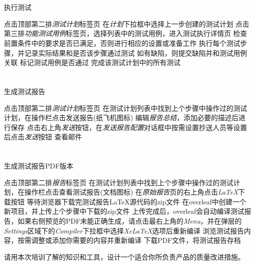 \documentclass[12pt,addpoints,fleqn]{exam}
\begin{document}
\begin{questions}
\begin{parts}
  \part{}执行测试
  \begin{subparts}
    \subpart{}点击顶部第二排\emph{测试计划}标签页
    \subpart{}在\emph{计划}下拉框中选择上一步创建的测试计划
    \subpart{}点击第三排\emph{功能测试用例}标签页，选择列表中的测试用例，进入测试执行详情页
    \subpart{}检查前置条件中的要求是否已满足，否则进行相应的设置或准备工作
    \subpart{}执行每个测试步骤，并记录实际结果和是否该步骤通过测试
    \subpart{}如有缺陷，则提交缺陷并和测试用例关联
    \subpart{}标记测试用例是否通过
    \subpart{}完成该测试计划中的所有测试
  \end{subparts}

  \part{}生成测试报告
  \begin{subparts}
    \subpart{}点击顶部第二排\emph{测试计划}标签页
    \subpart{}在测试计划列表中找到上个步骤中操作过的测试计划，在操作栏点击发送报告(纸飞机图标)
    \subpart{}编辑\emph{报告总结}，添加必要的描述后进行保存
    \subpart{}点击右上角\emph{发送}按钮，在\emph{发送报告配置}对话框中按需设置抄送人员等设置后点击\emph{发送}按钮
    \subpart{}查看邮件
  \end{subparts}

  \part{}生成测试报告PDF版本
  \begin{subparts}
    \subpart{}点击顶部第二排\emph{报告}标签页
    \subpart{}在测试计划列表中找到上个步骤中操作过的测试计划，在操作栏点击查看测试报告(文档图标)
    \subpart{}在\emph{原始报告}页的右上角点击\emph{LaTeX}下载按钮
    \subpart{}等待浏览器下载完测试报告LaTeX源代码的zip文件
    \subpart{}在overleaf中创建一个新项目，并上传上个步骤中下载的zip文件
    \subpart{}上传完成后，overleaf会自动编译测试报告，如果右侧预览的PDF未能正确生成，请点击最右上角的\emph{Menu}，并在弹层的\emph{Settings}区域下的\emph{Compiler}下拉框中选择\emph{XeLaTeX}选项后重新编译
    \subpart{}浏览测试报告内容，按需调整或添加你需要的内容并重新编译
    \subpart{}下载PDF文件，将测试报告存档
  \end{subparts}

\end{parts}
\newpage
\question[20] 
请用本次培训了解的知识和工具，设计一个适合你所负责产品的质量改进措施。

\end{questions}
\end{document}
